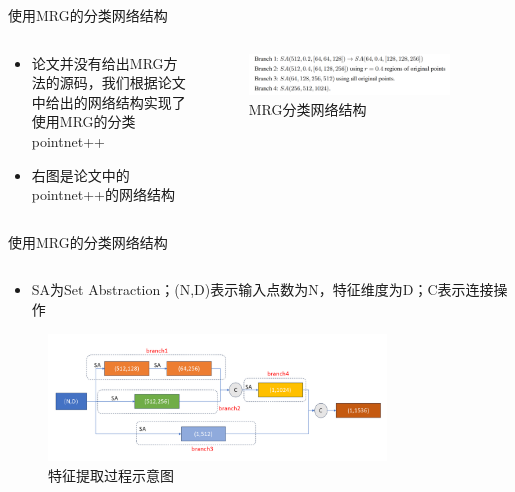 \begin{frame}{使用MRG的分类网络结构}
    \begin{columns}
        \begin{column}{0.50\textwidth}
            \begin{block}{}
                \begin{itemize}
                    \item 论文并没有给出MRG方法的源码，我们根据论文中给出的网络结构实现了使用MRG的分类pointnet++
                    \item 右图是论文中的pointnet++的网络结构
                \end{itemize}
            \end{block}
        \end{column}
        \begin{column}{0.50\textwidth}
            \begin{figure}
                \centering
                \includegraphics[width=0.9\textwidth]{doc/img/论文网络结构.png}
                \caption{MRG分类网络结构}
                \label{fig:structure}
            \end{figure}
        \end{column}
    \end{columns}
\end{frame}
\begin{frame}{使用MRG的分类网络结构}
    \begin{columns}
        \begin{column}{1\textwidth}
            \begin{block}{}
                \begin{itemize}
                    \item SA为Set Abstraction；(N,D)表示输入点数为N，特征维度为D；C表示连接操作
                \end{itemize}
            \end{block}
            \begin{figure}
                \centering
                \includegraphics[width=0.8\textwidth]{doc/img/网络示意图.png}
                \caption{特征提取过程示意图}
                \label{fig:network}
            \end{figure}
        \end{column}
    \end{columns}
\end{frame}